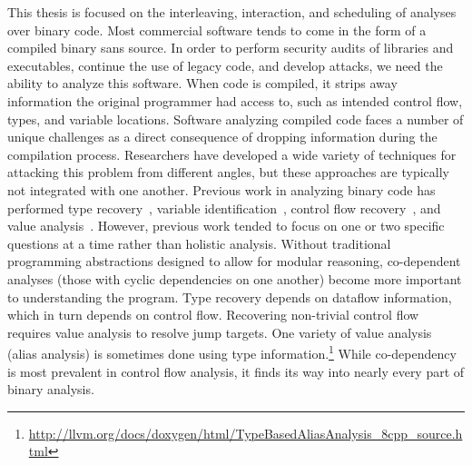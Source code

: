 {\fontsize{10}{12}\selectfont
This thesis is focused on the interleaving, interaction, and scheduling of analyses over binary code.
Most commercial software tends to come in the form of a compiled binary sans source.
In order to perform security audits of libraries and executables, continue the use of legacy code, and develop attacks, we need the ability to analyze this software.
When code is compiled, it strips away information the original programmer had access to, such as intended control flow, types, and variable locations.
Software analyzing compiled code faces a number of unique challenges as a direct consequence of dropping information during the compilation process.
Researchers have developed a wide variety of techniques for attacking this problem from different angles, but these approaches are typically not integrated with one another.
Previous work in analyzing binary code has performed type recovery~\cite{bitr}, variable identification~\cite{divine}, control flow recovery~\cite{jakstab,phoenix}, and value analysis~\cite{vsa}.
However, previous work tended to focus on one or two specific questions at a time rather than holistic analysis.
Without traditional programming abstractions designed to allow for modular reasoning, co-dependent analyses (those with cyclic dependencies on one another) become more important to understanding the program.
Type recovery depends on dataflow information\cite{bitr,tie,sndwrite}, which in turn depends on control flow.
Recovering non-trivial control flow requires value analysis to resolve jump targets.
One variety of value analysis (alias analysis) is sometimes done using type information.\footnote {
  \url{http://llvm.org/docs/doxygen/html/TypeBasedAliasAnalysis_8cpp_source.html}
}
While co-dependency is most prevalent in control flow analysis, it finds its way into nearly every part of binary analysis.
}

